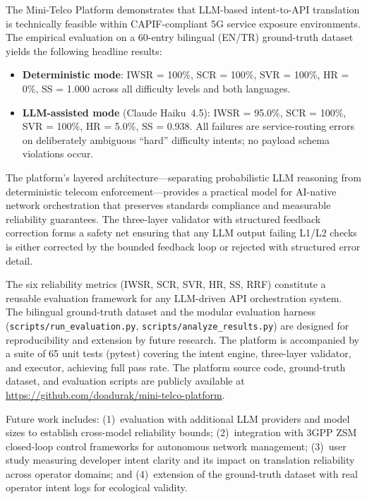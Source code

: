 \documentclass[conference]{IEEEtran}
\begin{document}
The Mini-Telco Platform demonstrates that LLM-based intent-to-API
translation is technically feasible within CAPIF-compliant 5G service
exposure environments. The empirical evaluation on a 60-entry bilingual
(EN/TR) ground-truth dataset yields the following headline results:

\begin{itemize}[leftmargin=1.5em]
  \item \textbf{Deterministic mode}: IWSR = 100\%, SCR = 100\%, SVR = 100\%,
        HR = 0\%, SS = 1.000 across all difficulty levels and both languages.
  \item \textbf{LLM-assisted mode} (Claude Haiku~4.5): IWSR = 95.0\%,
        SCR = 100\%, SVR = 100\%, HR = 5.0\%, SS = 0.938.
        All failures are service-routing errors on deliberately ambiguous
        ``hard'' difficulty intents; no payload schema violations occur.
\end{itemize}

The platform's layered architecture—separating probabilistic LLM reasoning
from deterministic telecom enforcement—provides a practical model for
AI-native network orchestration that preserves standards compliance and
measurable reliability guarantees. The three-layer validator with structured
feedback correction forms a safety net ensuring that any LLM output failing
L1/L2 checks is either corrected by the bounded feedback loop or rejected
with structured error detail.

The six reliability metrics (IWSR, SCR, SVR, HR, SS, RRF) constitute a
reusable evaluation framework for any LLM-driven API orchestration system.
The bilingual ground-truth dataset and the modular evaluation harness
(\texttt{scripts/run\_evaluation.py}, \texttt{scripts/analyze\_results.py})
are designed for reproducibility and extension by future research.
The platform is accompanied by a suite of 65 unit tests (pytest) covering
the intent engine, three-layer validator, and executor, achieving full
pass rate. The platform source code, ground-truth dataset, and evaluation
scripts are publicly available at
\url{https://github.com/doadurak/mini-telco-platform}.

Future work includes: (1)~evaluation with additional LLM providers and
model sizes to establish cross-model reliability bounds;
(2)~integration with 3GPP ZSM closed-loop control frameworks for
autonomous network management; (3)~user study measuring developer intent
clarity and its impact on translation reliability across operator domains;
and (4)~extension of the ground-truth dataset with real operator intent
logs for ecological validity.
\end{document}

